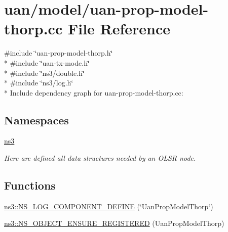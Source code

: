 \hypertarget{uan-prop-model-thorp_8cc}{}\section{uan/model/uan-\/prop-\/model-\/thorp.cc File Reference}
\label{uan-prop-model-thorp_8cc}
{\ttfamily \#include \char`\"{}uan-\/prop-\/model-\/thorp.\+h\char`\"{}}\\*
{\ttfamily \#include \char`\"{}uan-\/tx-\/mode.\+h\char`\"{}}\\*
{\ttfamily \#include \char`\"{}ns3/double.\+h\char`\"{}}\\*
{\ttfamily \#include \char`\"{}ns3/log.\+h\char`\"{}}\\*
Include dependency graph for uan-\/prop-\/model-\/thorp.cc\+:
\subsection*{Namespaces}
\begin{DoxyCompactItemize}
\item 
 \hyperlink{namespacens3}{ns3}
\begin{DoxyCompactList}\small\item\em Here are defined all data structures needed by an O\+L\+SR node. \end{DoxyCompactList}\end{DoxyCompactItemize}
\subsection*{Functions}
\begin{DoxyCompactItemize}
\item 
\hyperlink{namespacens3_a6d7b56a7dd573f7369ef34c1e641b316}{ns3\+::\+N\+S\+\_\+\+L\+O\+G\+\_\+\+C\+O\+M\+P\+O\+N\+E\+N\+T\+\_\+\+D\+E\+F\+I\+NE} (\char`\"{}Uan\+Prop\+Model\+Thorp\char`\"{})
\item 
\hyperlink{namespacens3_a59cccb5a0043c9c7b0ed0fa2e03098ba}{ns3\+::\+N\+S\+\_\+\+O\+B\+J\+E\+C\+T\+\_\+\+E\+N\+S\+U\+R\+E\+\_\+\+R\+E\+G\+I\+S\+T\+E\+R\+ED} (Uan\+Prop\+Model\+Thorp)
\end{DoxyCompactItemize}
